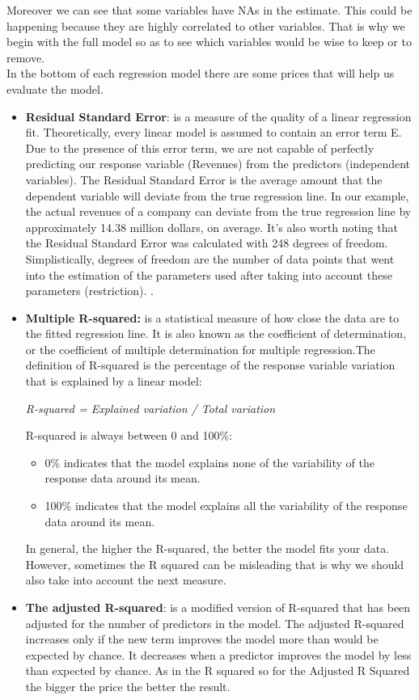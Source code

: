 \documentclass{book}
\begin{document}
Moreover we can see that some variables have NAs in the estimate. This could be happening because they are highly correlated to other variables. That is why we begin with the full model so as to see which variables would be wise to keep or to remove.\\
In the bottom of each regression model there are some prices that will help us evaluate the model.
\begin{itemize}
\item \textbf{Residual Standard Error}: is a measure of the quality of a linear regression fit. Theoretically, every linear model is assumed to contain an error term E. Due to the presence of this error term, we are not capable of perfectly predicting our response variable (Revenues) from the predictors (independent variables). The Residual Standard Error is the average amount that the dependent variable will deviate from the true regression line. In our example, the actual revenues of a company can deviate from the true regression line by approximately 14.38 million dollars, on average. It’s also worth noting that the Residual Standard Error was calculated with 248 degrees of freedom. Simplistically, degrees of freedom are the number of data points that went into the estimation of the parameters used after taking into account these parameters (restriction). .
\item \textbf{Multiple R-squared:} is a statistical measure of how close the data are to the fitted regression line. It is also known as the coefficient of determination, or the coefficient of multiple determination for multiple regression.The definition of R-squared is the percentage of the response variable variation that is explained by a linear model:
\begin{center}
\textit{R-squared = Explained variation / Total variation}
\end{center}
R-squared is always between 0 and 100\%:
\begin{itemize}
\item 0\% indicates that the model explains none of the variability of the response data around its mean.
\item 100\% indicates that the model explains all the variability of the response data around its mean.
\end{itemize}
In general, the higher the R-squared, the better the model fits your data. However, sometimes the R squared can be misleading that is why we should also take into account the next measure.
\item \textbf{The adjusted R-squared}: is a modified version of R-squared that has been adjusted for the number of predictors in the model. The adjusted R-squared increases only if the new term improves the model more than would be expected by chance. It decreases when a predictor improves the model by less than expected by chance. As in the R squared so for the Adjusted R Squared the bigger the price the better the result.

\end{itemize}
\end{document}
